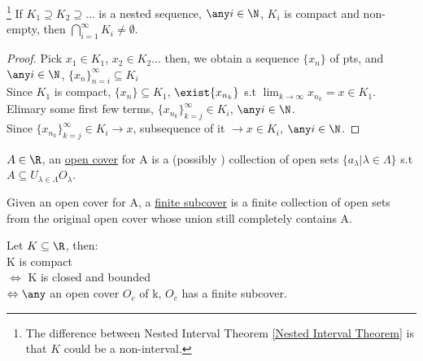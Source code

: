 \begin{theorem}\footnote{The difference between Nested Interval Theorem \ref{Nested Interval Theorem} is that $K$ could be a non-interval.}
\label{Nested Compact Set Property} 
    If $K_1 \supseteq K_2 \supseteq...$ is a nested sequence, $\any i \in \N$, $K_i$ is compact and non-empty, then $\bigcap\limits_{i=1}^\infty K_i \neq \emptyset$.
\end{theorem}
\begin{proof}
    Pick $x_1 \in K_1$, $x_2 \in K_2 ...$ then, we obtain a sequence $\{ x_n\}$ of pts, and $\any i \in \N$, $\{x_n\}_{n=i}^\infty \subseteq K_i$ \\
    Since $K_1$ is compact, $\{x_n\} \subseteq K_1$, $\exist\{x_{n_k}\}$ s.t $\lim_{k\to\infty} x_{n_k} = x \in K_1$. Elimary some first few terms, $\{x_{n_k}\}_{k=j}^\infty \in K_i$, $\any i \in \N$. \\
    Since $\{x_{n_k}\}_{k=j}^\infty \in K_i \rightarrow x$, subsequence of it $\rightarrow x \in K_i$, $\any i \in \N$.
\end{proof}
\begin{definition}
    $A \in \R$, an \underline{open cover} for A is a (possibly ) collection of open sets $\{a_\lambda | \lambda \in \Lambda\}$ s.t $A \subseteq U_{\lambda \in \Lambda} O_\lambda$.
\end{definition}
\begin{definition}
    Given an open cover for A, a \underline{finite subcover} is a finite collection of open sets from the original open cover whose union still completely contains A.
\end{definition}
\begin{theorem}
\label{Heine-Borel Theorem}
    Let $K \subseteq \R$, then: \\
    \indent K is compact \\
    $\Leftrightarrow$ K is closed and bounded \\
    $\Leftrightarrow \any$ an open cover $O_c$ of k, $O_c$ has a finite subcover.
\end{theorem}

